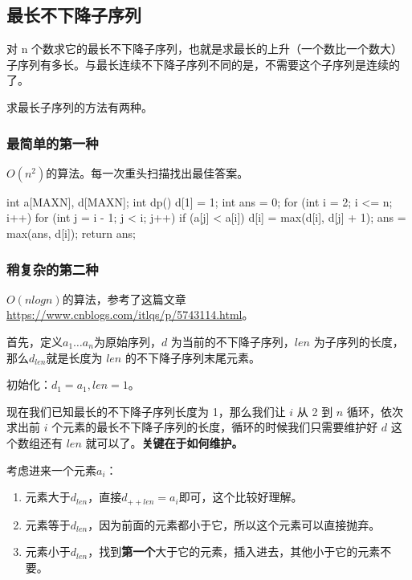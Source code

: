 \subsection{最长不下降子序列}

对 n 个数求它的最长不下降子序列，也就是求最长的上升（一个数比一个数大）子序列有多长。与最长连续不下降子序列不同的是，不需要这个子序列是连续的了。

求最长子序列的方法有两种。

\subsubsection{最简单的第一种}

$O\left(n^2\right)$的算法。每一次重头扫描找出最佳答案。

\begin{cppcode}
int a[MAXN], d[MAXN];
int dp() {
  d[1] = 1;
  int ans = 0;
  for (int i = 2; i <= n; i++) {
    for (int j = i - 1; j < i; j++)
      if (a[j] < a[i]) {
        d[i] = max(d[i], d[j] + 1);
        ans = max(ans, d[i]);
      }
  }
  return ans;
}
\end{cppcode}

\subsubsection{稍复杂的第二种}

$O\left(n log n\right)$的算法，参考了这篇文章\url{https://www.cnblogs.com/itlqs/p/5743114.html}。

首先，定义$a_1 \dots a_n$为原始序列，$d$ 为当前的不下降子序列，$len$ 为子序列的长度，那么$d_{len}$就是长度为 $len$ 的不下降子序列末尾元素。

初始化：$d_1=a_1,len=1$。

现在我们已知最长的不下降子序列长度为 1，那么我们让 $i$ 从 2 到 $n$ 循环，依次求出前 $i$ 个元素的最长不下降子序列的长度，循环的时候我们只需要维护好 $d$ 这个数组还有 $len$ 就可以了。\textbf{关键在于如何维护。}

考虑进来一个元素$a_i$：

\begin{enumerate}
\item 元素大于$d_{len}$，直接$d_{++len}=a_i$即可，这个比较好理解。
\item 元素等于$d_{len}$，因为前面的元素都小于它，所以这个元素可以直接抛弃。
\item 元素小于$d_{len}$，找到\textbf{第一个}大于它的元素，插入进去，其他小于它的元素不要。
\end{enumerate}

